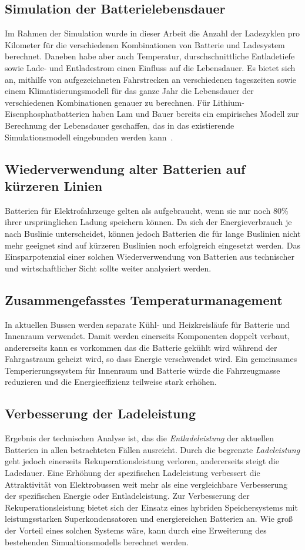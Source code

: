 \subsection{Simulation der Batterielebensdauer}
Im Rahmen der Simulation wurde in dieser Arbeit die Anzahl der Ladezyklen pro Kilometer für die verschiedenen Kombinationen von Batterie und Ladesystem berechnet. Daneben habe aber auch Temperatur, durschschnittliche Entladetiefe sowie Lade- und Entladestrom einen Einfluss auf die Lebensdauer. Es bietet sich an, mithilfe von aufgezeichneten Fahrstrecken an verschiedenen tageszeiten sowie einem Klimatisierungsmodell für das ganze Jahr die Lebensdauer der verschiedenen Kombinationen genauer zu berechnen. Für Lithium-Eisenphosphatbatterien haben Lam und Bauer bereits ein empirisches Modell zur Berechnung der Lebensdauer geschaffen, das in das existierende Simulationsmodell eingebunden werden kann~\cite{lam2013practical}.

\subsection{Wiederverwendung alter Batterien auf kürzeren Linien}
Batterien für Elektrofahrzeuge gelten als aufgebraucht, wenn sie nur noch 80\% ihrer ursprünglichen Ladung speichern können. Da sich der Energieverbrauch je nach Buslinie unterscheidet, können jedoch Batterien die für lange Buslinien nicht mehr geeignet sind auf kürzeren Buslinien noch erfolgreich eingesetzt werden. Das Einsparpotenzial einer solchen Wiederverwendung von Batterien aus technischer und wirtschaftlicher Sicht sollte weiter analysiert werden.

\subsection{Zusammengefasstes Temperaturmanagement}
In aktuellen Bussen werden separate Kühl- und Heizkreisläufe für Batterie und Innenraum verwendet. Damit werden einerseits Komponenten doppelt verbaut, andererseits kann es vorkommen das die Batterie gekühlt wird während der Fahrgastraum geheizt wird, so dass Energie verschwendet wird. Ein gemeinsames Temperierungssystem für Innenraum und Batterie würde die Fahrzeugmasse reduzieren und die Energieeffizienz teilweise stark erhöhen.

\subsection{Verbesserung der Ladeleistung}
Ergebnis der technischen Analyse ist, das die \emph{Entladeleistung} der aktuellen Batterien in allen betrachteten Fällen ausreicht. Durch die begrenzte \emph{Ladeleistung} geht jedoch einerseits Rekuperationsleistung verloren, andererseits steigt die Ladedauer. Eine Erhöhung der spezifischen Ladeleistung verbessert die Attraktivität von Elektrobussen weit mehr als eine vergleichbare Verbesserung der spezifischen Energie oder Entladeleistung. Zur Verbesserung der Rekuperationsleistung bietet sich der Einsatz eines hybriden Speichersystems mit leistungsstarken Superkondensatoren und energiereichen Batterien an. Wie groß der Vorteil eines solchen Systems wäre, kann durch eine Erweiterung des bestehenden Simualtionsmodells berechnet werden.